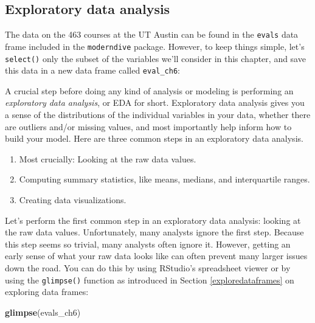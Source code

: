 \documentclass[12pt, krantz2,]{krantz}
\makeatletter
\newenvironment{Shaded}{\begin{snugshade}}{\end{snugshade}}
\newcommand{\KeywordTok}[1]{\textcolor[rgb]{0.27,0.27,0.27}{\textbf{#1}}}
\newcommand{\NormalTok}[1]{#1}
\newcommand{\OperatorTok}[1]{\textcolor[rgb]{0.43,0.43,0.43}{\textbf{#1}}}
\newcommand{\StringTok}[1]{\textcolor[rgb]{0.5,0.5,0.5}{#1}}
\providecommand{\tightlist}{%
  \setlength{\itemsep}{0pt}\setlength{\parskip}{0pt}}
\newenvironment{kframe}{%
\medskip{}
\setlength{\fboxsep}{.8em}
 \def\at@end@of@kframe{}%
 \ifinner\ifhmode%
  \def\at@end@of@kframe{\end{minipage}}%
  \begin{minipage}{\columnwidth}%
 \fi\fi%
 \def\FrameCommand##1{\hskip\@totalleftmargin \hskip-\fboxsep
 \colorbox{shadecolor}{##1}\hskip-\fboxsep
     \hskip-\linewidth \hskip-\@totalleftmargin \hskip\columnwidth}%
 \MakeFramed {\advance\hsize-\width
   \@totalleftmargin\z@ \linewidth\hsize
   \@setminipage}}%
 {\par\unskip\endMakeFramed%
 \at@end@of@kframe}
\renewenvironment{Shaded}{\begin{kframe}}{\end{kframe}}
\makeatother
\begin{document}
\hypertarget{model1EDA}{%
\subsection{Exploratory data analysis}\label{model1EDA}}

The data on the 463 courses at the UT Austin can be found in the \texttt{evals} data frame included in the \texttt{moderndive} package. However, to keep things simple, let's \texttt{select()} only the subset of the variables we'll consider in this chapter, and save this data in a new data frame called \texttt{eval\_ch6}:

\begin{Shaded}
\end{Shaded}

A crucial step before doing any kind of analysis or modeling is performing an \emph{exploratory data analysis}, or EDA for short. Exploratory data analysis gives you a sense of the distributions of the individual variables in your data, whether there are outliers and/or missing values, and most importantly help inform how to build your model. Here are three common steps in an exploratory data analysis.

\begin{enumerate}
\def\labelenumi{\arabic{enumi}.}
\tightlist
\item
  Most crucially: Looking at the raw data values.
\item
  Computing summary statistics, like means, medians, and interquartile ranges.
\item
  Creating data visualizations.
\end{enumerate}

Let's perform the first common step in an exploratory data analysis: looking at the raw data values. Unfortunately, many analysts ignore the first step. Because this step seems so trivial, many analysts often ignore it. However, getting an early sense of what your raw data looks like can often prevent many larger issues down the road. You can do this by using RStudio's spreadsheet viewer or by using the \texttt{glimpse()} function as introduced in Section \ref{exploredataframes} on exploring data frames:

\begin{Shaded}
\begin{Highlighting}[]
\KeywordTok{glimpse}\NormalTok{(evals_ch6)}
\end{Highlighting}
\end{Shaded}
\end{document}
